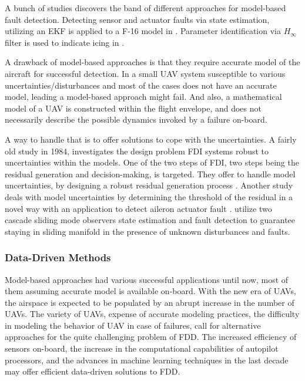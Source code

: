 A bunch of studies discovers the band of different approaches for model-based fault detection. 
Detecting sensor and actuator faults via state estimation, utilizing an EKF is applied to a 
F-16 model in \cite{hajiyev2005sensor}. Parameter identification via $H_{\infty}$ filter 
is used to indicate icing in \cite{melody2001h}.

A drawback of model-based approaches is that they require accurate model of the 
aircraft for successful detection. In a small UAV system susceptible to various 
uncertainties/disturbances and most of the cases does not have an accurate model, 
leading a model-based approach might fail. And also, a mathematical model of a UAV 
is constructed within the flight envelope, and does not necessarily describe the 
possible dynamics invoked by a failure on-board.

A way to handle that is to offer solutions to cope with the uncertainties. 
A fairly old study in 1984, investigates the design problem FDI systems robust to 
uncertainties within the models. One of the two steps of FDI, two steps being the 
residual generation and decision-making, is targeted. They offer to handle model 
uncertainties, by designing a robust residual generation process \cite{chow1984analytical}. 
Another study deals with model uncertainties by determining the threshold of the residual 
in a novel way with an application to detect aileron actuator fault \cite{rotstein2006fault}. 
\cite{sharma2007fault} utilize two cascade sliding mode observers state estimation and 
fault detection to guarantee staying in sliding manifold in the presence of unknown 
disturbances and faults. 
%

\subsubsection{Data-Driven Methods}

Model-based approaches had various successful applications until now, 
most of them assuming accurate model is available on-board. With the new 
era of UAVs, the airspace is expected to be populated by an abrupt increase 
in the number of UAVs. The variety of UAVs, expense of accurate modeling 
practices, the difficulty in modeling the behavior of UAV in case of failures, 
call for alternative approaches for the quite challenging problem of FDD. 
The increased efficiency of sensors on-board, the increase in the computational 
capabilities of autopilot processors, and the advances in machine learning 
techniques in the last decade may offer efficient data-driven solutions to FDD.

